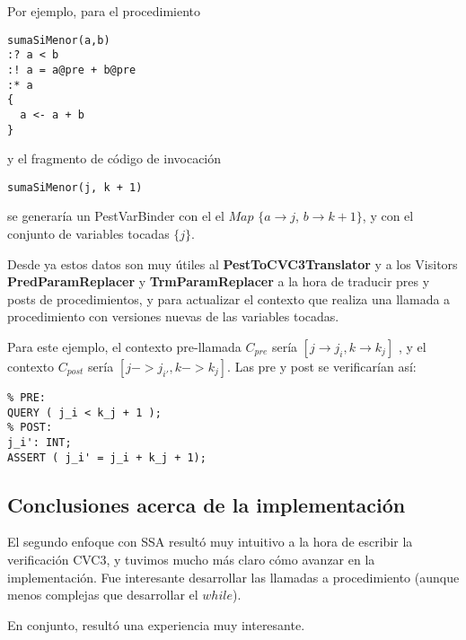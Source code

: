 \documentclass[a4paper]{article}
\begin{document}
Por ejemplo, para el procedimiento
\begin{verbatim}
sumaSiMenor(a,b)
:? a < b
:! a = a@pre + b@pre
:* a
{
  a <- a + b
}
\end{verbatim}
y el fragmento de código de invocación
\begin{verbatim}
sumaSiMenor(j, k + 1)
\end{verbatim}
se generaría un PestVarBinder con el el $Map$ $\{a \rightarrow j$, $b \rightarrow k + 1\}$, y con el conjunto de variables tocadas $\{ j \}$.

Desde ya estos datos son muy útiles al \textbf{PestToCVC3Translator} y a los Visitors \textbf{PredParamReplacer} y \textbf{TrmParamReplacer} a la hora de traducir pres y posts de procedimientos, y para actualizar el contexto que realiza una llamada a procedimiento con versiones nuevas de las variables tocadas.

Para este ejemplo, el contexto pre-llamada $C_{pre} $ sería $ [ j \rightarrow j_i, k \rightarrow k_j ]$ , y el contexto $C_{post}$ sería $[ j -> j_{i'}, k -> k_j ]$. Las pre y post se verificarían así:
\begin{verbatim}
% PRE:
QUERY ( j_i < k_j + 1 );
% POST:
j_i': INT;
ASSERT ( j_i' = j_i + k_j + 1);
\end{verbatim}

\subsection{Conclusiones acerca de la implementación}

El segundo enfoque con SSA resultó muy intuitivo a la hora de escribir la verificación CVC3, y tuvimos mucho más claro cómo avanzar en la implementación. Fue interesante desarrollar las llamadas a procedimiento (aunque menos complejas que desarrollar el $while$).

En conjunto, resultó una experiencia muy interesante.
\end{document}
